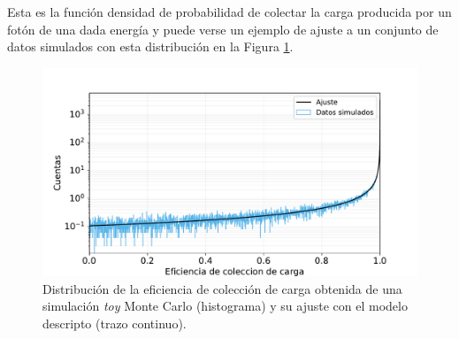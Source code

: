 Esta es la función densidad de probabilidad de colectar la carga producida por un fotón de una dada energía y puede verse un ejemplo de ajuste a un conjunto de datos simulados con esta distribución en la Figura \ref{fig:BetaDistyAjuste}.
\begin{figure}[h]
    \centering
        \includegraphics[scale=0.5]{Figs/BetaDistyAjuste.pdf}
    \caption{Distribución de la eficiencia de colección de carga obtenida de una simulación \textit{toy} Monte Carlo (histograma) y su ajuste con el modelo descripto (trazo continuo).}
    \label{fig:BetaDistyAjuste}
\end{figure}

